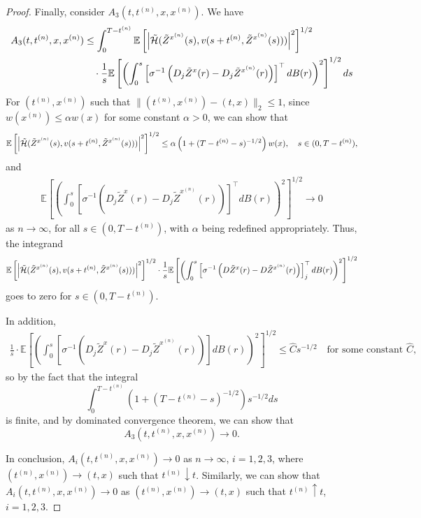 \documentclass[11pt]{article}
\theoremstyle{definition}
\theoremstyle{plain}
\newcommand{\cH}{{\cal H}}
\begin{document}
\begin{appendices}
\begin{proof}
Finally, consider \( A_3(t, t^{(n)}, x, x^{(n)}) \).  
We have
\begin{align*}
A_3(t, t^{(n)}, x, x^{(n)}) 
&\leq \int_0^{T - t^{(n)}} \mathbb{E} \left[ \left| \tilde \cH(\tilde{Z}^{x^{(n)}}(s), v(s + t^{(n)}, \tilde{Z}^{x^{(n)}}(s))) \right|^2 \right]^{1/2} \\
&\quad \cdot \frac{1}{s} \mathbb{E} \left[ \left( \int_0^s \left[\sigma^{-1} \left( D_j \tilde{Z}^x(r) - D_j \tilde{Z}^{x^{(n)}}(r) \right)\right]^{\top} dB(r) \right)^2 \right]^{1/2} ds
\end{align*}
For $(t^{(n)}, x^{(n)})$ such that \( \|(t^{(n)}, x^{(n)}) - (t,x)\|_2 \leq 1 \), since $w(x^{(n)}) \leq \alpha w(x)$ for some constant $\alpha >0$, we can  
show that
\begin{align*}
\mathbb{E} \left[ \left| \tilde \cH(\tilde{Z}^{x^{(n)}}(s), v(s + t^{(n)}, \tilde{Z}^{x^{(n)}}(s))) \right|^2 \right]^{1/2} 
\leq \alpha \left( 1 + (T - t^{(n)} - s)^{-1/2} \right) w(x), \quad s \in (0, T - t^{(n)}),
\end{align*}
and
\begin{align*}
\mathbb{E} \left[ \left( \int_0^s \left[\sigma^{-1}(D_j \tilde{Z}^x(r) - D_j \tilde{Z}^{x^{(n)}}(r))\right]^{\top} dB(r) \right)^2 \right]^{1/2} \to 0
\end{align*}
as \( n \to \infty \), for all \( s \in (0, T - t^{(n)}) \), with $\alpha$ being redefined appropriately. 
Thus, the integrand
\[
\mathbb{E} \left[ \left| \tilde \cH(\tilde{Z}^{x^{(n)}}(s), v(s + t^{(n)}, \tilde{Z}^{x^{(n)}}(s))) \right|^2 \right]^{1/2}
\cdot \frac{1}{s} \mathbb{E} \left[ \left( \int_0^s \left[\sigma^{-1} \left( D \tilde{Z}^x(r) - D \tilde{Z}^{x^{(n)}}(r) \right)\right]^{\top}_j dB(r) \right)^2 \right]^{1/2}
\] 
goes to zero for \( s \in (0, T - t^{(n)}) \).

In addition,
\begin{align*}
\frac{1}{s} \cdot \mathbb{E} \left[ \left( \int_0^s \left[\sigma^{-1}(D_j \tilde{Z}^x(r) - D_j\tilde{Z}^{x^{(n)}}(r))\right] dB(r) \right)^2 \right]^{1/2}
\leq \hat C s^{-1/2} \quad \text{for some constant } \hat C, 
\end{align*}
so by the fact that the integral
\[
\int_0^{T - t^{(n)}} \left( 1 + (T - t^{(n)} - s)^{-1/2} \right) s^{-1/2} ds
\]
is finite, and by dominated convergence theorem, we can show that  
\[
A_3(t, t^{(n)}, x, x^{(n)}) \to 0.
\]

In conclusion, \( A_i(t, t^{(n)}, x, x^{(n)}) \to 0 \)  
as \( n \to \infty \), \( i = 1, 2, 3 \), where \( (t^{(n)}, x^{(n)}) \to (t,x) \)  
such that \( t^{(n)} \downarrow t \).
Similarly, we can show that  
\( A_i(t, t^{(n)}, x, x^{(n)}) \to 0 \) as \( (t^{(n)}, x^{(n)}) \to (t,x) \) such that \( t^{(n)} \uparrow t \), $i=1, 2, 3$.


\end{proof}
\end{appendices}
\end{document}
